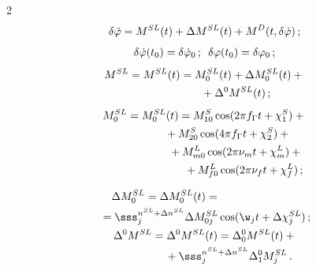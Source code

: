 \begin{multicols}{2}
\begin{gather}


\delta \ddot\varphi = M^{SL} (t) +\Delta M^{SL} (t)+ M^{D} (t, \delta \dot\varphi)\,;\label{e60-mar}\\[4pt]


\delta\dot\varphi (t_0) =\delta \dot\varphi_0\,;\enskip \delta\varphi (t_0) =\delta \varphi_0\,;


    \label{e61-mar}\\[4pt]


M^{SL} =M^{SL} (t)= M^{SL}_0 (t) +\Delta M^{SL}_0 (t) +{}\notag\\


\hspace*{20mm}{}+\Delta^0 M^{SL} (t)\,;\label{e62-mar}\\[4pt]


M^{SL}_0 =M^{SL}_0(t) =M^{S}_{10} \cos (2\pi f_\Gamma t +\chi_1^{S})+{}\notag\\


\hspace*{15mm}{}+M^{S}_{20}\cos (4\pi f_\Gamma t +\chi_2^{S})+{}\notag\\


\hspace*{20mm}{}+M^{L}_{m0} \cos (2\pi \nu_m t +\chi_m^{L})+ {}\notag\\


\hspace*{25mm}{}+M^{L}_{f0} \cos (2\pi \nu_f t +\chi_f^{L})\,;\label{e63-mar}


\end{gather}





\noindent


\begin{gather}


\hspace*{-25mm}\Delta M^{SL}_0 =\Delta M^{SL}_0 (t)= {}\notag\\


{}=


\sss_{j}^{n^{SL}+\Delta n^{SL}} \Delta M^{SL}_{0j} \cos (\w_j t + \Delta \chi_j^{SL})\,;


\label{e64-mar}\\


\Delta^0 M^{SL} =\Delta^0 M^{SL} (t)= \Delta_0^0 M^{SL} (t)+ {}\notag\\


\hspace*{15mm}{}+\sss_{j}^{n^{SL}+\Delta n^{SL}}  \Delta_1^0 M^{SL}_{j} \,.



\end{gather}
\end{multicols}
